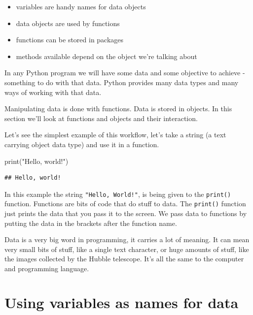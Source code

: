 \documentclass[]{book}
\newenvironment{Shaded}{\begin{snugshade}}{\end{snugshade}}
\newcommand{\BuiltInTok}[1]{#1}
\newcommand{\NormalTok}[1]{#1}
\newcommand{\StringTok}[1]{\textcolor[rgb]{0.31,0.60,0.02}{#1}}
\providecommand{\tightlist}{%
  \setlength{\itemsep}{0pt}\setlength{\parskip}{0pt}}
\theoremstyle{definition}
\theoremstyle{definition}
\theoremstyle{definition}
\theoremstyle{remark}
\let\BeginKnitrBlock\begin \let\EndKnitrBlock\end
\begin{document}
\begin{itemize}
\tightlist
\item
  variables are handy names for data objects
\item
  data objects are used by functions
\item
  functions can be stored in packages
\item
  methods available depend on the object we're talking about
\end{itemize}

In any Python program we will have some data and some objective to
achieve - something to do with that data. Python provides many data
types and many ways of working with that data.

Manipulating data is done with functions. Data is stored in objects. In
this section we'll look at functions and objects and their interaction.

Let's see the simplest example of this workflow, let's take a string (a
text carrying object data type) and use it in a function.

\begin{Shaded}
\begin{Highlighting}[]
\BuiltInTok{print}\NormalTok{(}\StringTok{"Hello, world!"}\NormalTok{)}
\end{Highlighting}
\end{Shaded}

\begin{verbatim}
## Hello, world!
\end{verbatim}

In this example the string \texttt{"Hello,\ World!"}, is being given to
the \texttt{print()} function. Functions are bits of code that do stuff
to data. The \texttt{print()} function just prints the data that you
pass it to the screen. We pass data to functions by putting the data in
the brackets after the function name.

\BeginKnitrBlock{reader}
Data is a very big word in programming, it carries a lot of meaning. It
can mean very small bits of stuff, like a single text character, or huge
amounts of stuff, like the images collected by the Hubble telescope.
It's all the same to the computer and programming language.
\EndKnitrBlock{reader}

\hypertarget{using-variables-as-names-for-data}{%
\section{Using variables as names for
data}\label{using-variables-as-names-for-data}}
\end{document}
